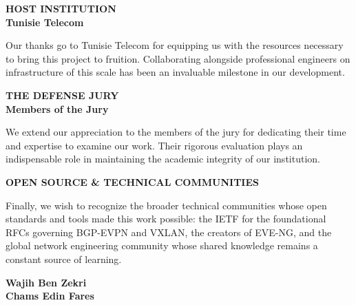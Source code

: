 \vspace{2.5em}

\noindent
\begin{minipage}[t]{0.28\textwidth}
    \raggedright
    \textbf{\uppercase{Host Institution}}
    \vspace{0.3em} \\
    \small\textbf{Tunisie Telecom}
\end{minipage}
\hfill
\begin{minipage}[t]{0.68\textwidth}
    \small Our thanks go to Tunisie Telecom for equipping us with the resources necessary to bring this project to fruition. Collaborating alongside professional engineers on infrastructure of this scale has been an invaluable milestone in our development.
\end{minipage}

\vspace{2.5em}

\noindent
\begin{minipage}[t]{0.28\textwidth}
    \raggedright
    \textbf{\uppercase{The Defense Jury}}
    \vspace{0.3em} \\
    \small\textbf{Members of the Jury}
\end{minipage}
\hfill
\begin{minipage}[t]{0.68\textwidth}
    \small We extend our appreciation to the members of the jury for dedicating their time and expertise to examine our work. Their rigorous evaluation plays an indispensable role in maintaining the academic integrity of our institution.
\end{minipage}

\vspace{2.5em}

\noindent
\begin{minipage}[t]{0.28\textwidth}
    \raggedright
    \textbf{\uppercase{Open Source \& Technical Communities}}
\end{minipage}
\hfill
\begin{minipage}[t]{0.68\textwidth}
    \small Finally, we wish to recognize the broader technical communities whose open standards and tools made this work possible: the IETF for the foundational RFCs governing BGP-EVPN and VXLAN, the creators of EVE-NG, and the global network engineering community whose shared knowledge remains a constant source of learning.
\end{minipage}

\vfill
\begin{flushright}
    \textbf{\Large Wajih Ben Zekri}\\
    \vspace{0.3em}
    \textbf{\Large Chams Edin Fares}
\end{flushright}
